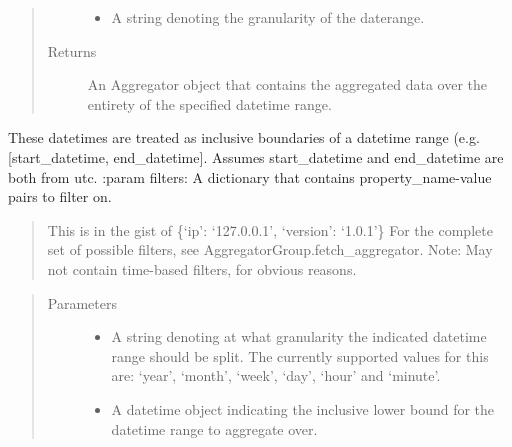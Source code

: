 \documentclass[letterpaper,10pt,english]{sphinxmanual}
\begin{document}
\begin{fulllineitems}
\begin{fulllineitems}
\begin{quote}
\begin{description}
\begin{itemize}
\item {} 
 \textendash{} A string denoting the granularity of the daterange.

\end{itemize}

\item[{Returns}] \leavevmode
An Aggregator object that contains the aggregated data over the entirety of the specified datetime
range.

\end{description}\end{quote}

\end{fulllineitems}


\begin{fulllineitems}
\label{\detokenize{pydash_app.dashboard.aggregator.aggregator_group:pydash_app.dashboard.aggregator.aggregator_group.AggregatorGroup.fetch_aggregators_per_timeslice}}
These datetimes are treated as inclusive boundaries of a datetime range (e.g. {[}start\_datetime, end\_datetime{]}.
Assumes start\_datetime and end\_datetime are both from utc.
:param filters: A dictionary that contains property\_name-value pairs to filter on.
\begin{quote}

This is in the gist of \{‘ip’: ‘127.0.0.1’, ‘version’: ‘1.0.1’\}
For the complete set of possible filters, see AggregatorGroup.fetch\_aggregator.
Note: May not contain time-based filters, for obvious reasons.
\end{quote}
\begin{quote}\begin{description}
\item[{Parameters}] \leavevmode\begin{itemize}
\item {} 
 \textendash{} A string denoting at what granularity the indicated datetime range should be split.
The currently supported values for this are: ‘year’, ‘month’, ‘week’, ‘day’, ‘hour’ and ‘minute’.

\item {} 
 \textendash{} A datetime object indicating the inclusive lower bound for the datetime range to
aggregate over.


\end{itemize}
\end{description}
\end{quote}
\end{fulllineitems}
\end{fulllineitems}
\end{document}
